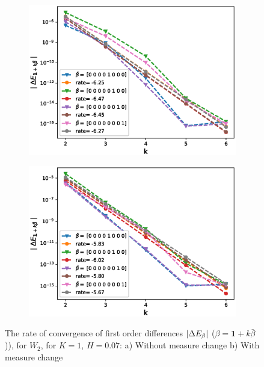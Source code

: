 \documentclass[11pt]{article}
\begin{document}
\begin{figure}[h!]
	\centering
	\begin{subfigure}{.45\textwidth}
		\centering
		\includegraphics[width=1\linewidth]{./figures/rBergomi_mixed_error_rates/without_change_measure/N_4/H_007/first_difference_rbergomi_4steps_H_007_K_1_totally_hierarch_with_rate_W2}
		\caption{}
		\label{fig:sub3}
	\end{subfigure}%
	\begin{subfigure}{.45\textwidth}
		\centering
		\includegraphics[width=1\linewidth]{./figures/rBergomi_mixed_error_rates/partial_change_measure/N_4/H_007/first_difference_rbergomi_4steps_H_007_K_1_totally_hierarch_with_rate_W2_change_measure_part_spec}
		\caption{}
		\label{fig:sub4}
	\end{subfigure}
	
	\caption{The rate of convergence of  first order differences $\left\lvert\Delta E_{\beta}\right\rvert$ ($\beta=\mathbf{1}+k \bar{\beta}$)), for $W_2$, for $K=1$, $H=0.07$: a) Without measure change b) With measure change}
	\label{fig:first_diff_comp_K_1_H_007_W_2}
\end{figure}
\end{document}
